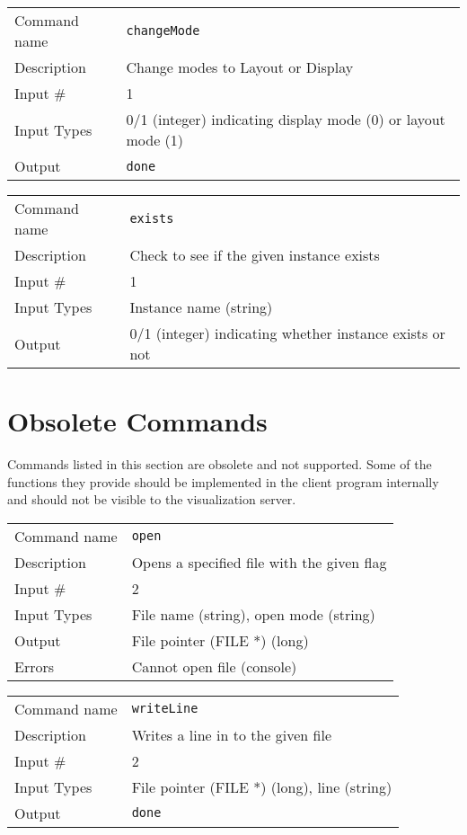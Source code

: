 \noindent
\begin{tabular}{l|p{5in}}
\hline
Command name & {\tt changeMode} \\
Description  & Change modes to Layout or Display \\
Input \#     & 1 \\
Input Types  & 0/1 (integer) indicating display mode (0) or layout mode (1) \\
Output       & {\tt done} \\
\hline
\end{tabular}

\bigskip

\noindent
\begin{tabular}{l|p{5in}}
\hline
Command name & {\tt exists} \\
Description  & Check to see if the given instance exists \\
Input \#     & 1 \\
Input Types  & Instance name (string) \\
Output       & 0/1 (integer) indicating whether instance exists or not \\
\hline
\end{tabular}

\section{Obsolete Commands}

Commands listed in this section are obsolete and not supported. Some
of the functions they provide should be implemented in the client
program internally and should not be visible to the visualization
server.

\bigskip

\noindent
\begin{tabular}{l|p{5in}}
\hline
Command name & {\tt open} \\
Description  & Opens a specified file with the given flag \\
Input \#     & 2 \\
Input Types  & File name (string), open mode (string) \\
Output       & File pointer (FILE *) (long) \\
Errors       & Cannot open file (console) \\
\hline
\end{tabular}

\bigskip

\noindent
\begin{tabular}{l|p{5in}}
\hline
Command name & {\tt writeLine} \\
Description  & Writes a line in to the given file \\
Input \#     & 2 \\
Input Types  & File pointer (FILE *) (long), line (string) \\
Output       & {\tt done} \\
\hline
\end{tabular}

